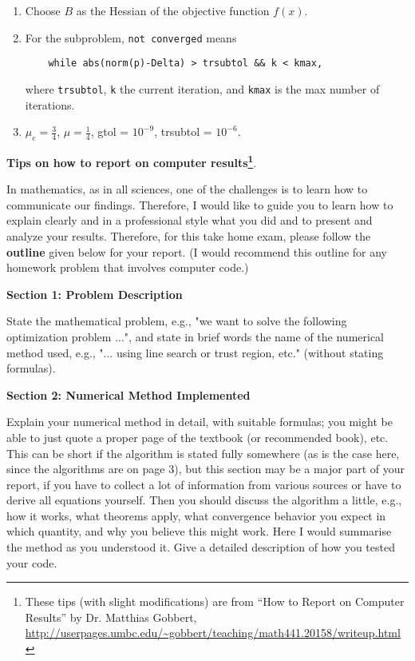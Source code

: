\documentclass[11pt]{article}
\newcommand{\zapspace}{\topsep=0pt\partopsep=0pt\itemsep=0pt\parskip=0pt}
\begin{document}
\begin{enumerate}
  \zapspace
\item Choose $B$ as the Hessian of the objective function $f(x)$.
\item For the subproblem, \verb+not converged+ means
  \begin{verbatim}
    while abs(norm(p)-Delta) > trsubtol && k < kmax,
\end{verbatim}
  where \verb+trsubtol+, \verb+k+ the current iteration, and
  \verb+kmax+ is the max number of iterations.
  \item $\mu_e = \frac{3}{4}$, $\mu = \frac{1}{4}$, gtol = $10^{-9}$,
    trsubtol = $10^{-6}$.
\end{enumerate}

\begin{center}
  {\bf Tips on how to report on computer results\footnote{These tips
      (with slight modifications) are from ``How to Report on Computer
      Results'' by Dr. Matthias Gobbert,
      \url{http://userpages.umbc.edu/~gobbert/teaching/math441.20158/writeup.html}}}.
\end{center}

In mathematics, as in all sciences, one of the challenges is to learn
how to communicate our findings. Therefore, I would like to guide you
to learn how to explain clearly and in a professional style what you
did and to present and analyze your results. Therefore, for this take
home exam, please follow the {\bf outline} given below for your
report. (I would recommend this outline for any homework problem that
involves computer code.)

\vspace{0.2cm}
{\bf Section 1: Problem Description}

\vspace{0.1cm} State the mathematical problem, e.g., "we want to solve
the following optimization problem ...", and state in brief words the
name of the numerical method used, e.g., "... using line search or
trust region, etc." (without stating formulas).

\vspace{0.1cm}
{\bf Section 2: Numerical Method Implemented}

\vspace{0.1cm} Explain your numerical method in detail, with suitable
formulas; you might be able to just quote a proper page of the
textbook (or recommended book), etc. This can be short if the
algorithm is stated fully somewhere (as is the case here, since the
algorithms are on page 3), but this section may be a major part of
your report, if you have to collect a lot of information from various
sources or have to derive all equations yourself. Then you should
discuss the algorithm a little, e.g., how it works, what theorems
apply, what convergence behavior you expect in which quantity, and why
you believe this might work. Here I would summarise the method as you
understood it. Give a detailed description of how you tested your
code.
\end{document}
